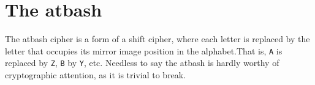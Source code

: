 
\section{The atbash}
\label{sec:atbash}

The atbash cipher is a form of a shift cipher, where each letter is
replaced by the letter that occupies its mirror image position in the
alphabet.\indAtbash That is, {\tt A} is replaced by {\tt Z}, {\tt B}
by {\tt Y}, etc. Needless to say the atbash is hardly worthy of
cryptographic attention, as it is trivial to break.

